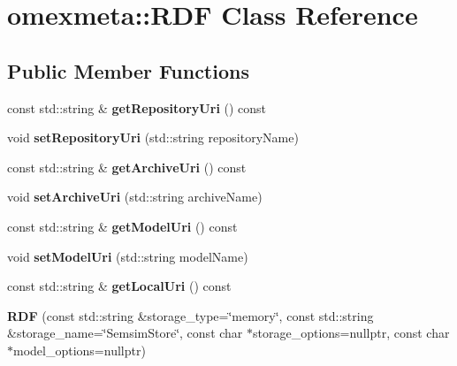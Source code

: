 \hypertarget{classomexmeta_1_1RDF}{}\section{omexmeta\+:\+:R\+DF Class Reference}
\label{classomexmeta_1_1RDF}
\subsection*{Public Member Functions}
\begin{DoxyCompactItemize}
\item 
\mbox{\label{classomexmeta_1_1RDF_a60b4a0a8c0c4f30a9cc71f9899bffabc}} 
const std\+::string \& {\bfseries get\+Repository\+Uri} () const
\item 
\mbox{\label{classomexmeta_1_1RDF_a9e8669ac5cf5dbcaf235f535f7482a7a}} 
void {\bfseries set\+Repository\+Uri} (std\+::string repository\+Name)
\item 
\mbox{\label{classomexmeta_1_1RDF_a1b3bd1292e77c1d87720f854ec5a04bd}} 
const std\+::string \& {\bfseries get\+Archive\+Uri} () const
\item 
\mbox{\label{classomexmeta_1_1RDF_a77ba0cbdb6070ac78f14044197d79cd8}} 
void {\bfseries set\+Archive\+Uri} (std\+::string archive\+Name)
\item 
\mbox{\label{classomexmeta_1_1RDF_ac579ac8b79eb7d374a9077114837d2ef}} 
const std\+::string \& {\bfseries get\+Model\+Uri} () const
\item 
\mbox{\label{classomexmeta_1_1RDF_ad5310903d0e1a7a7ee890478f18b6181}} 
void {\bfseries set\+Model\+Uri} (std\+::string model\+Name)
\item 
\mbox{\label{classomexmeta_1_1RDF_a58b64a5972f74564994028504d8d227c}} 
const std\+::string \& {\bfseries get\+Local\+Uri} () const
\item 
\mbox{\label{classomexmeta_1_1RDF_aecb90e51830082f78ff055c045f4b439}} 
{\bfseries R\+DF} (const std\+::string \&storage\+\_\+type=\char`\"{}memory\char`\"{}, const std\+::string \&storage\+\_\+name=\char`\"{}Semsim\+Store\char`\"{}, const char $\ast$storage\+\_\+options=nullptr, const char $\ast$model\+\_\+options=nullptr)

\end{DoxyCompactItemize}
